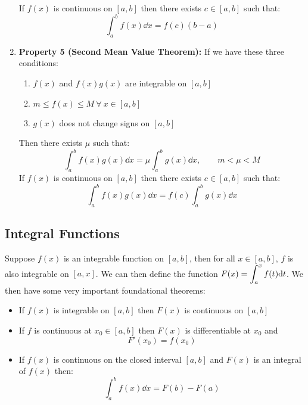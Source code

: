 \documentclass[12pt]{article}
\begin{document}
\begin{enumerate}
    If $f(x)$ is continuous on $[a,b]$ then there exists $c \in [a,b]$ such that:
        \begin{equation*}
        \int_a^b f(x) \dd x = f(c) (b-a)
    \end{equation*}
    \item \textbf{Property 5 (Second Mean Value Theorem):}
    If we have these three conditions:
    \begin{enumerate}
        \item $f(x)$ and $f(x)g(x)$ are integrable on $[a,b]$
        \item $m \leq f(x) \leq M \ \forall \ x \in [a,b]$
        \item $g(x)$ does not change signs on $[a,b]$
    \end{enumerate}
    Then there exists $\mu$ such that:
    \begin{equation*}
        \int_a^b f(x)g(x) \dd x = \mu \int_a^b g(x) \dd x, \qquad m< \mu < M
    \end{equation*}
    If $f(x)$ is continuous on $[a,b]$ then there exists $c \in [a,b]$ such that:
    \begin{equation*}
        \int_a^b f(x)g(x) \dd x = f(c) \int_a^b g(x) \dd x
    \end{equation*}
\end{enumerate}
\subsection{Integral Functions}
Suppose $f(x)$ is an integrable function on $[a,b]$, then for all $x \in [a,b]$, $f$ is also integrable on $[a,x]$. We can then define the function $F(x) = \mathlarger{\int_a^x f(t) \dd t}$. We then have some very important foundational theorems:
\begin{concept}
    \begin{itemize}
        \item If $f(x)$ is integrable on $[a,b]$ then $F(x)$ is continuous on $[a,b]$
        \item If $f$ is continuous at $x_0 \in [a,b]$ then $F(x)$ is differentiable at $x_0$ and $$F'(x_0) = f(x_0)$$
        \item If $f(x)$ is continuous on the closed interval $[a,b]$ and $F(x)$ is an integral of $f(x)$ then:
        \begin{equation*}
            \int_a^b f(x) \dd x = F(b) - F(a)
        \end{equation*}
    \end{itemize}
\end{concept}
\end{document}
